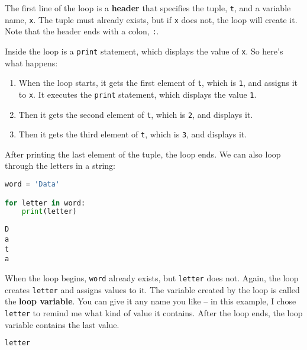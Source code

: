 The first line of the loop is a \textbf{header} that specifies the
tuple, \passthrough{\lstinline!t!}, and a variable name,
\passthrough{\lstinline!x!}. The tuple must already exists, but if
\passthrough{\lstinline!x!} does not, the loop will create it. Note that
the header ends with a colon, \passthrough{\lstinline!:!}.

Inside the loop is a \passthrough{\lstinline!print!} statement, which
displays the value of \passthrough{\lstinline!x!}. So here's what
happens:

\begin{enumerate}
\def\labelenumi{\arabic{enumi}.}
\item
  When the loop starts, it gets the first element of
  \passthrough{\lstinline!t!}, which is \passthrough{\lstinline!1!}, and
  assigns it to \passthrough{\lstinline!x!}. It executes the
  \passthrough{\lstinline!print!} statement, which displays the value
  \passthrough{\lstinline!1!}.
\item
  Then it gets the second element of \passthrough{\lstinline!t!}, which
  is \passthrough{\lstinline!2!}, and displays it.
\item
  Then it gets the third element of \passthrough{\lstinline!t!}, which
  is \passthrough{\lstinline!3!}, and displays it.
\end{enumerate}

After printing the last element of the tuple, the loop ends. We can also
loop through the letters in a string:

\begin{lstlisting}[language=Python,style=source]
word = 'Data'

for letter in word:
    print(letter)
\end{lstlisting}

\begin{lstlisting}[style=output]
D
a
t
a
\end{lstlisting}

When the loop begins, \passthrough{\lstinline!word!} already exists, but
\passthrough{\lstinline!letter!} does not. Again, the loop creates
\passthrough{\lstinline!letter!} and assigns values to it. The variable
created by the loop is called the \textbf{loop variable}. You can give
it any name you like -- in this example, I chose
\passthrough{\lstinline!letter!} to remind me what kind of value it
contains. After the loop ends, the loop variable contains the last
value.

\begin{lstlisting}[language=Python,style=source]
letter
\end{lstlisting}

